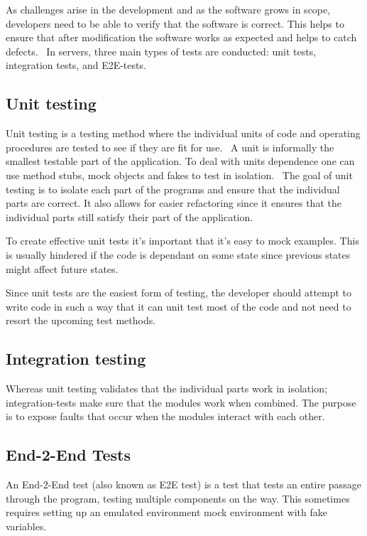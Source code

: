 As challenges arise in the development and as the software grows in scope,
developers need to be able to verify that the software is correct. This helps to
ensure that after modification the software works as expected and helps to catch
defects.~\cite{williams2009effectiveness} In servers, three main types of tests
are conducted: unit tests, integration tests, and E2E-tests.

\subsection{Unit testing}

Unit testing is a testing method where the individual units of code and
operating procedures are tested to see if they are fit for
use.~\cite{beck2003test} A unit is informally the smallest testable part of the
application.  To deal with units dependence one can use method stubs, mock
objects and fakes to test in isolation.~\cite{coelho2006unit} The goal of unit
testing is to isolate each part of the programs and ensure that the individual
parts are correct. It also allows for easier refactoring since it ensures that
the individual parts still satisfy their part of the application.

To create effective unit tests it's important that it's easy to mock examples.
This is usually hindered if the code is dependant on some state since previous
states might affect future states.

Since unit tests are the easiest form of testing, the developer should attempt
to write code in such a way that it can unit test most of the code and not need
to resort the upcoming test methods.

\subsection{Integration testing}

Whereas unit testing validates that the individual parts work in isolation;
integration-tests make sure that the modules work when combined. The purpose is
to expose faults that occur when the modules interact with each other.

\subsection{End-2-End Tests}

An End-2-End test (also known as E2E test) is a test that tests an entire
passage through the program, testing multiple components on the way. This
sometimes requires setting up an emulated environment mock environment with fake
variables.

